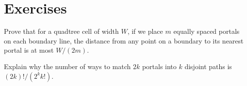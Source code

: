 \section{Exercises}
\begin{exercise}
Prove that for a quadtree cell of width $W$, if we place $m$ equally spaced portals on each boundary line, the distance from any point on a boundary to its nearest portal is at most $W / (2m)$.
\end{exercise}
\begin{exercise}
Explain why the number of ways to match $2k$ portals into $k$ disjoint paths is $(2k)! / (2^k k!)$.
\end{exercise}

